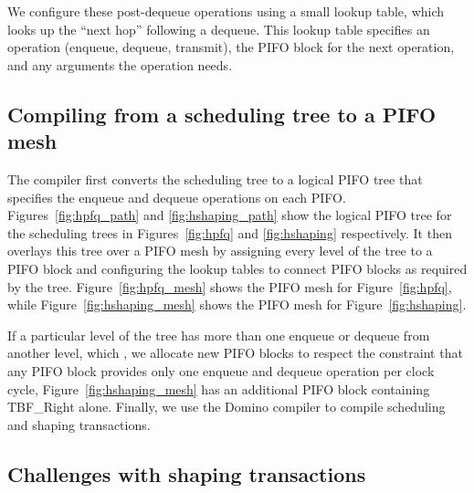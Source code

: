 We configure these post-dequeue operations using a small lookup table, which
looks up the ``next hop'' following a dequeue. This lookup table specifies an
operation (enqueue, dequeue, transmit), the PIFO block for the next operation,
and any arguments the operation needs.

\subsection{Compiling from a scheduling tree to a PIFO mesh}
\label{pifo_ss:compiler}


The compiler first converts the scheduling tree to a logical PIFO tree that
specifies the enqueue and dequeue operations on each PIFO.
Figures~\ref{fig:hpfq_path} and \ref{fig:hshaping_path} show the logical PIFO tree for
the scheduling trees in Figures~\ref{fig:hpfq} and \ref{fig:hshaping} respectively.  It then overlays
this tree over a PIFO mesh by assigning every level of the tree to a PIFO block
and configuring the lookup tables to connect PIFO blocks as required by the
tree.  Figure~\ref{fig:hpfq_mesh} shows the PIFO mesh for
Figure~\ref{fig:hpfq}, while Figure~\ref{fig:hshaping_mesh} shows the PIFO mesh
for Figure~\ref{fig:hshaping}.

If a particular level of the tree has more than one enqueue or dequeue from
another level, which , we allocate new PIFO blocks to respect the
constraint that any PIFO block provides only one enqueue and dequeue operation per
clock cycle, \eg Figure~\ref{fig:hshaping_mesh} has an additional PIFO block
containing TBF\_Right alone. Finally, we use the Domino compiler to compile
scheduling and shaping transactions.

\subsection{Challenges with shaping transactions}
\label{ss:shape_challenge}

